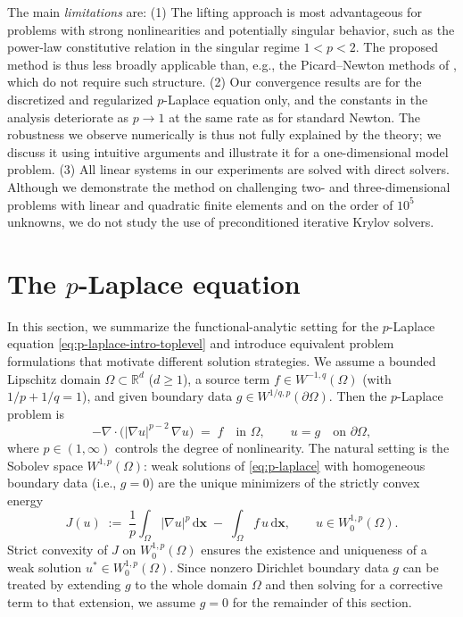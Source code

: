\documentclass[11pt,pdflatex,sn-mathphys-num]{sn-jnl}
\theoremstyle{thmstyleone}%
\theoremstyle{thmstyletwo}%
\theoremstyle{thmstylethree}%
\newcommand{\bs}[1]{\ensuremath{\boldsymbol{#1}}}
\begin{document}
The main \emph{limitations} are:
(1) The lifting approach is most advantageous for problems with strong nonlinearities and potentially singular behavior, such as the power-law constitutive relation in the singular regime $1<p<2$.
The proposed method is thus less broadly applicable than, e.g., the Picard--Newton methods of \cite{PollockRebholzTuXiao25}, which do not require such structure.
(2) Our convergence results are for the discretized and regularized $p$-Laplace equation only, and the constants in the analysis deteriorate as $p\to1$ at the same rate as for standard Newton. The robustness we observe numerically is thus not fully explained by the theory; we discuss it using intuitive arguments and illustrate it for a one-dimensional model problem.
(3) All linear systems in our experiments are solved with direct solvers. Although we demonstrate the method on challenging two- and three-dimensional problems with linear and quadratic finite elements and on the order of $10^5$ unknowns, we do not study the use of preconditioned iterative Krylov solvers.


\section{The $p$-Laplace equation}
\label{sec:p-laplacian}
In this section, we summarize the functional-analytic setting for the $p$-Laplace equation \eqref{eq:p-laplace-intro-toplevel} and introduce equivalent problem formulations that motivate different solution strategies.
We assume a bounded Lipschitz domain $\Omega \subset \mathbb{R}^d$ ($d\geq 1$), a source term
$f \in W^{-1,q}(\Omega)$ (with $1/p+1/q=1$), and given boundary
data $g \in W^{1/q,p}(\partial\Omega)$. Then the $p$-Laplace problem is
\begin{equation}
\label{eq:p-laplace}
-\nabla \cdot \bigl( |\nabla u|^{p-2}\, \nabla u \bigr) \;=\; f
\quad \text{in } \Omega, \qquad u = g \quad \text{on } \partial\Omega,
\end{equation}
where $p \in (1,\infty)$ controls the degree of
nonlinearity.
The natural setting is the Sobolev space
$W^{1,p}(\Omega)$: weak solutions of \eqref{eq:p-laplace} with homogeneous boundary data (i.e., $g=0$) are the unique minimizers of the strictly convex energy
\begin{equation}
J(u) \;:=\; \frac{1}{p}\int_\Omega |\nabla u|^{p}\,\mathrm{d}\bs x
       \;-\; \int_\Omega f\, u \,\mathrm{d}\bs x,
\qquad u \in W^{1,p}_0(\Omega). \label{eq:p-energy}
\end{equation}
Strict convexity of $J$ on $W^{1,p}_0(\Omega)$ ensures the existence and uniqueness of a weak solution $u^* \in W^{1,p}_0(\Omega)$.
Since nonzero Dirichlet boundary data $g$ can be treated by extending $g$ to the whole domain $\Omega$ and then solving for a corrective term to that extension, we assume $g=0$ for the remainder of this section.
\end{document}
